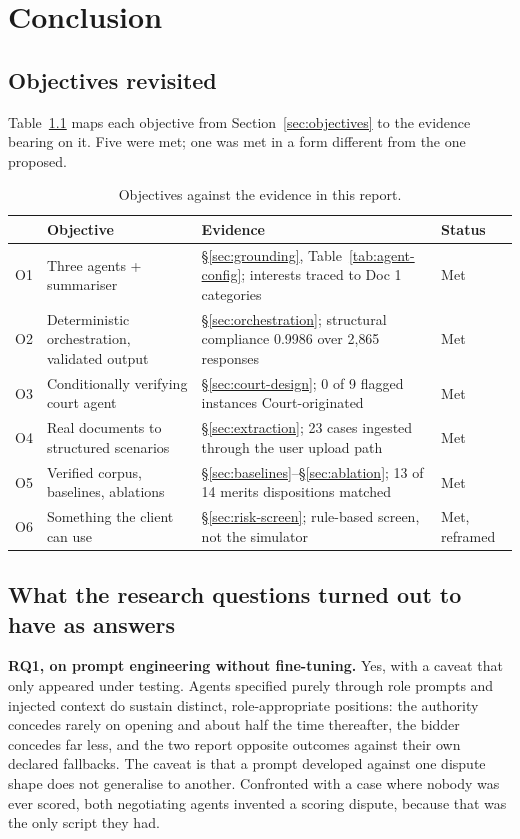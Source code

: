 \chapter{Conclusion}
\label{ch:conclusion}

\section{Objectives revisited}

Table~\ref{tab:objectives} maps each objective from Section~\ref{sec:objectives}
to the evidence bearing on it. Five were met; one was met in a form different from
the one proposed.

\begin{table}[htbp]
\centering
\footnotesize
\caption[Objectives against evidence]{Objectives against the evidence in this
report.}
\label{tab:objectives}
\begin{tabular}{@{}clp{5.5cm}l@{}}
\toprule
& \textbf{Objective} & \textbf{Evidence} & \textbf{Status} \\
\midrule
O1 & Three agents + summariser & \S\ref{sec:grounding}, Table~\ref{tab:agent-config};
     interests traced to Doc 1 categories & Met \\
O2 & Deterministic orchestration, validated output & \S\ref{sec:orchestration};
     structural compliance 0.9986 over 2{,}865 responses & Met \\
O3 & Conditionally verifying court agent & \S\ref{sec:court-design};
     0 of 9 flagged instances Court-originated & Met \\
O4 & Real documents to structured scenarios & \S\ref{sec:extraction};
     23 cases ingested through the user upload path & Met \\
O5 & Verified corpus, baselines, ablations & \S\ref{sec:baselines}--\S\ref{sec:ablation};
     13 of 14 merits dispositions matched & Met \\
O6 & Something the client can use & \S\ref{sec:risk-screen};
     rule-based screen, not the simulator & Met, reframed \\
\bottomrule
\end{tabular}
\end{table}

\section{What the research questions turned out to have as answers}

\textbf{RQ1, on prompt engineering without fine-tuning.} Yes, with a caveat that
only appeared under testing. Agents specified purely through role prompts and
injected context do sustain distinct, role-appropriate positions: the authority
concedes rarely on opening and about half the time thereafter, the bidder concedes
far less, and the two report opposite outcomes against their own declared
fallbacks. The caveat is that a prompt developed against one dispute shape does
not generalise to another. Confronted with a case where nobody was ever scored,
both negotiating agents invented a scoring dispute, because that was the only
script they had.


